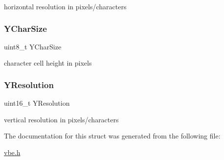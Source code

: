 horizontal resolution in pixels/characters 

\mbox{\label{struct____attribute_____a330f00ebd49dccd2325d43cdbd646f09}} 
\subsubsection{\texorpdfstring{Y\+Char\+Size}{YCharSize}}
{\footnotesize\ttfamily uint8\+\_\+t Y\+Char\+Size}



character cell height in pixels 

\mbox{\label{struct____attribute_____afa8aba2156994750d500f85d0f8425cb}} 
\subsubsection{\texorpdfstring{Y\+Resolution}{YResolution}}
{\footnotesize\ttfamily uint16\+\_\+t Y\+Resolution}



vertical resolution in pixels/characters 



The documentation for this struct was generated from the following file\+:\begin{DoxyCompactItemize}
\item 
\hyperlink{vbe_8h}{vbe.\+h}\end{DoxyCompactItemize}
